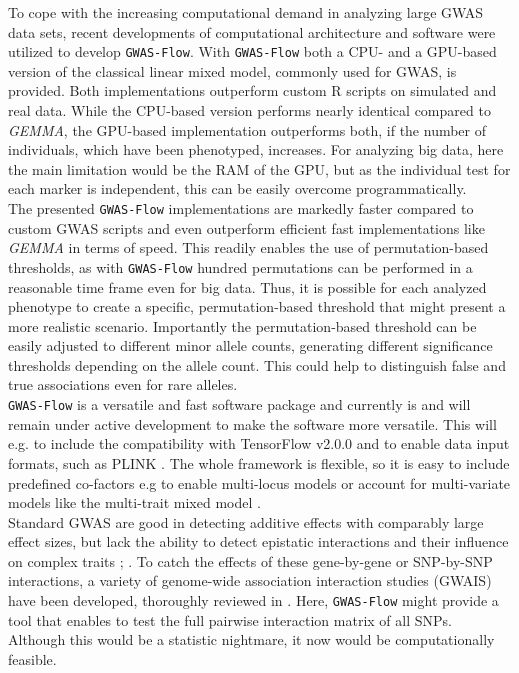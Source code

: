 To cope with the increasing computational demand in analyzing large GWAS data sets, recent
developments of computational architecture and software were utilized to develop
\texttt{GWAS-Flow}. With \texttt{GWAS-Flow} both a CPU- and a GPU-based version of the
classical linear mixed model, commonly used for GWAS, is provided. Both implementations
outperform custom R scripts on simulated and real data. While the CPU-based version
performs nearly identical compared to \textit{GEMMA}, the GPU-based implementation
outperforms both, if the number of individuals, which have been phenotyped, increases. For
analyzing big data, here the main limitation would be the RAM of the GPU, but as the
individual test for each marker is
independent, this can be easily overcome programmatically. \\
The presented \texttt{GWAS-Flow} implementations are markedly faster compared to custom
GWAS scripts and even outperform efficient fast implementations like \textit{GEMMA} in
terms of speed. This readily enables the use of permutation-based thresholds, as with
\texttt{GWAS-Flow} hundred permutations can be performed in a reasonable time frame even
for big data. Thus, it is possible for each analyzed phenotype to create a specific,
permutation-based threshold that might present a more realistic scenario. Importantly the
permutation-based threshold can be easily adjusted to different minor allele counts,
generating different significance thresholds depending on the allele count. This could
help to distinguish false and true associations even for rare alleles.\\
\texttt{GWAS-Flow} is a versatile and fast software package and currently is and will
remain under active development to make the software more versatile. This will e.g. to
include the compatibility with TensorFlow v2.0.0 and to enable data input formats, such as
PLINK \cite{purcell2007plink}. The whole framework is flexible, so it is easy to include
predefined co-factors e.g to enable multi-locus models \cite{segura2012efficient} or
account for multi-variate models like the multi-trait mixed model
\cite{korte2012mixed}. \\
Standard GWAS are good in detecting additive effects with comparably large effect sizes,
but lack the ability to detect epistatic interactions and their influence on complex
traits \cite{mckinney2012six}; \cite{korte2013advantages}. To catch the effects of these
gene-by-gene or SNP-by-SNP interactions, a variety of genome-wide association interaction
studies (GWAIS) have been developed, thoroughly reviewed in \cite{ritchie2018GWAIS}. Here,
\texttt{GWAS-Flow} might provide a tool that enables to test the full pairwise interaction
matrix of all SNPs. Although this would be a statistic nightmare, it now would be
computationally feasible.


